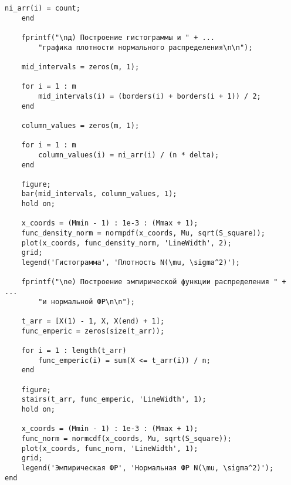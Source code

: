 \begin{center}
\begin{lstlisting}[label=lst:lab]
        ni_arr(i) = count;
    end

    fprintf("\nд) Построение гистограммы и " + ...
        "графика плотности нормального распределения\n\n"); 
    
    mid_intervals = zeros(m, 1);
    
    for i = 1 : m
        mid_intervals(i) = (borders(i) + borders(i + 1)) / 2;
    end
    
    column_values = zeros(m, 1);
    
    for i = 1 : m
        column_values(i) = ni_arr(i) / (n * delta);
    end
    
    figure;
    bar(mid_intervals, column_values, 1);
    hold on;
    
    x_coords = (Mmin - 1) : 1e-3 : (Mmax + 1);
    func_density_norm = normpdf(x_coords, Mu, sqrt(S_square)); 
    plot(x_coords, func_density_norm, 'LineWidth', 2);
    grid;
    legend('Гистограмма', 'Плотность N(\mu, \sigma^2)');
    
    fprintf("\nе) Построение эмпирической функции распределения " + ...
        "и нормальной ФР\n\n");   
    
    t_arr = [X(1) - 1, X, X(end) + 1];
    func_emperic = zeros(size(t_arr));
    
    for i = 1 : length(t_arr)
        func_emperic(i) = sum(X <= t_arr(i)) / n;
    end
    
    figure;
    stairs(t_arr, func_emperic, 'LineWidth', 1);
    hold on;
    
    x_coords = (Mmin - 1) : 1e-3 : (Mmax + 1);
    func_norm = normcdf(x_coords, Mu, sqrt(S_square));
    plot(x_coords, func_norm, 'LineWidth', 1);
    grid;
    legend('Эмпирическая ФР', 'Нормальная ФР N(\mu, \sigma^2)');
end
\end{lstlisting}
\end{center}